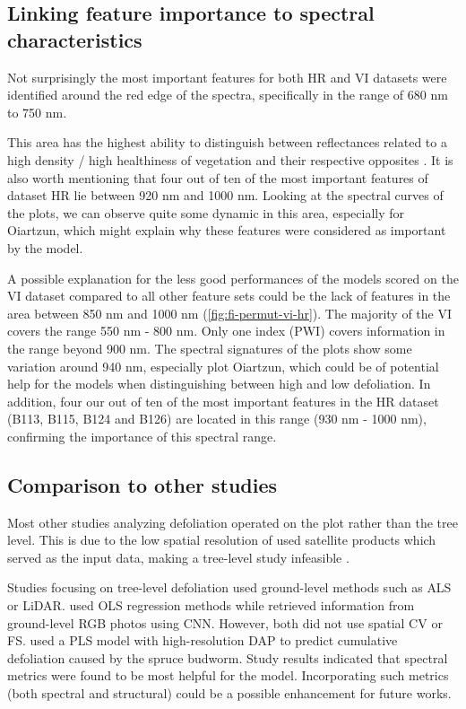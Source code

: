 \documentclass[letterpaper, peerreview, draftcls]{IEEEtran}
\begin{document}
\subsection{Linking feature importance to spectral characteristics}

Not surprisingly the most important features for both HR and VI datasets were identified around the red edge of the spectra, specifically in the range of 680 nm to 750 nm.

This area has the highest ability to distinguish between reflectances related to a high density / high healthiness of vegetation and their respective opposites \cite{horler1983}.
It is also worth mentioning that four out of ten of the most important features of dataset HR lie between 920 nm and 1000 nm.
Looking at the spectral curves of the plots, we can observe quite some dynamic in this area, especially for Oiartzun, which might explain why these features were considered as important by the model.

A possible explanation for the less good performances of the models scored on the VI dataset compared to all other feature sets could be the lack of features in the area between 850 nm and 1000 nm (\autoref{fig:fi-permut-vi-hr}).
The majority of the VI covers the range 550 nm - 800 nm.
Only one index (PWI) covers information in the range beyond 900 nm.
The spectral signatures of the plots show some variation around 940 nm, especially plot Oiartzun, which could be of potential help for the models when distinguishing between high and low defoliation.
In addition, four our out of ten of the most important features in the HR dataset (B113, B115, B124 and B126) are located in this range (930 nm - 1000 nm), confirming the importance of this spectral range.

\subsection{Comparison to other studies}

\noindent Most other studies analyzing defoliation operated on the plot rather than the tree level.
This is due to the low spatial resolution of used satellite products which served as the input data, making a tree-level study infeasible \cite{townsend2012, debeurs2008, rengarajan2016}.

Studies focusing on tree-level defoliation used ground-level methods such as \ac{ALS} or \ac{LiDAR}\cite{meng2018, kalin2019}.
\cite{meng2018} used \ac{OLS} regression methods while \cite{kalin2019} retrieved information from ground-level RGB photos using \ac{CNN}.
However, both did not use spatial \ac{CV} or \ac{FS}.
\cite{goodbody2018} used a \ac{PLS} model with high-resolution \ac{DAP} to predict cumulative defoliation caused by the spruce budworm.
Study results indicated that spectral metrics were found to be most helpful for the model.
Incorporating such metrics (both spectral and structural) could be a possible enhancement for future works.
\end{document}
